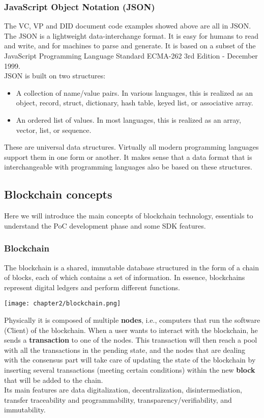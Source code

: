 \subsubsection{JavaScript Object Notation (JSON)}
\label{subsubsec:json}
The VC, VP and DID document code examples showed above are all in JSON.\\
The JSON is a lightweight data-interchange format. It is easy for humans to read and 
write, and for machines to parse and generate. It is based on a subset of the JavaScript
Programming Language Standard ECMA-262 3rd Edition - December 1999.\\
JSON is built on two structures:
\begin{itemize}
    \item A collection of name/value pairs. In various languages, this is realized as an 
    object, record, struct, dictionary, hash table, keyed list, or associative array.
    \item An ordered list of values. In most languages, this is realized as an array, 
    vector, list, or sequence.
\end{itemize}
These are universal data structures. Virtually all modern programming languages support 
them in one form or another. It makes sense that a data format that is interchangeable 
with programming languages also be based on these structures.
\subsection{Blockchain concepts}
Here we will introduce the main concepts of blockchain technology, essentials to 
understand the PoC development phase and some SDK features.
\subsubsection{Blockchain}
The blockchain is a shared, immutable database structured in the form of a chain of 
blocks, each of which contains a set of information. In essence, blockchains represent 
digital ledgers and perform different functions.
\begin{center}
    \texttt{[image: chapter2/blockchain.png]}
\end{center}
Physically it is composed of multiple \textbf{nodes}, i.e., computers that run the software 
(Client) of the blockchain. When a user wants to interact with the blockchain, he 
sends a \textbf{transaction} to one of the nodes. This transaction will then reach a pool with 
all the transactions in the pending state, and the nodes that are dealing with the 
consensus part will take care of updating the state of the blockchain by inserting 
several transactions (meeting certain conditions) within the new \textbf{block} that will
be added to the chain.\\
Its main features are data digitalization, decentralization, disintermediation, 
transfer traceability and programmability, transparency/verifiability, and immutability.
